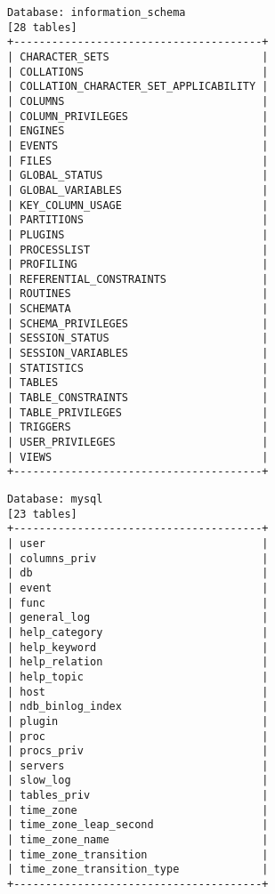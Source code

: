 \documentclass[10pt,a4paper]{article}
\begin{document}
\begin{verbatim}
Database: information_schema
[28 tables]
+---------------------------------------+
| CHARACTER_SETS                        |
| COLLATIONS                            |
| COLLATION_CHARACTER_SET_APPLICABILITY |
| COLUMNS                               |
| COLUMN_PRIVILEGES                     |
| ENGINES                               |
| EVENTS                                |
| FILES                                 |
| GLOBAL_STATUS                         |
| GLOBAL_VARIABLES                      |
| KEY_COLUMN_USAGE                      |
| PARTITIONS                            |
| PLUGINS                               |
| PROCESSLIST                           |
| PROFILING                             |
| REFERENTIAL_CONSTRAINTS               |
| ROUTINES                              |
| SCHEMATA                              |
| SCHEMA_PRIVILEGES                     |
| SESSION_STATUS                        |
| SESSION_VARIABLES                     |
| STATISTICS                            |
| TABLES                                |
| TABLE_CONSTRAINTS                     |
| TABLE_PRIVILEGES                      |
| TRIGGERS                              |
| USER_PRIVILEGES                       |
| VIEWS                                 |
+---------------------------------------+
\end{verbatim}

\begin{verbatim}
Database: mysql
[23 tables]
+---------------------------------------+
| user                                  |
| columns_priv                          |
| db                                    |
| event                                 |
| func                                  |
| general_log                           |
| help_category                         |
| help_keyword                          |
| help_relation                         |
| help_topic                            |
| host                                  |
| ndb_binlog_index                      |
| plugin                                |
| proc                                  |
| procs_priv                            |
| servers                               |
| slow_log                              |
| tables_priv                           |
| time_zone                             |
| time_zone_leap_second                 |
| time_zone_name                        |
| time_zone_transition                  |
| time_zone_transition_type             |
+---------------------------------------+
\end{verbatim}
\end{document}
